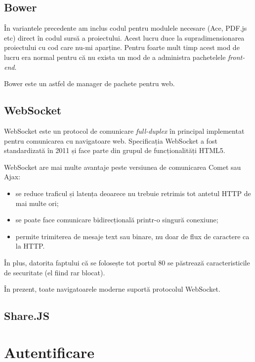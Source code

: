 \documentclass[a4wide,12pt]{report}
\newcommand{\eng}[1]{\emph{#1}} %
\begin{document}
\subsection{Bower}
\label{bowersub}

În variantele precedente am inclus codul pentru modulele necesare (Ace, PDF.js
etc) direct în codul sursă a proiectului. Acest lucru duce la supradimensionarea
proiectului cu cod care nu-mi aparține. Pentru foarte mult timp acest mod de
lucru era normal pentru că nu exista un mod de a administra pachetelele
\eng{front-end}.

Bower este un astfel de manager de pachete pentru web.

\subsection{WebSocket}
\label{websocketsub}

WebSocket este un protocol de comunicare \eng{full-duplex} în principal
implementat pentru comunicarea cu navigatoare web. Specificația WebSocket a fost
standardizată în 2011 și face parte din grupul de funcționalități HTML5.

WebSocket are mai multe avantaje peste versiunea de comunicarea Comet sau Ajax:

\begin{itemize}

\item se reduce traficul și latența deoarece nu trebuie retrimis tot antetul
HTTP de mai multe ori;

\item se poate face comunicare bidirecțională printr-o singură conexiune;

\item permite trimiterea de mesaje text sau binare, nu doar de flux de caractere
ca la HTTP.

\end{itemize}

În plus, datorita faptului că se folosește tot portul 80 se păstrează
caracteristicile de securitate (el fiind rar blocat).

În prezent, toate navigatoarele moderne suportă protocolul WebSocket.

\subsection{Share.JS}
\label{sharejssub}

\section{Autentificare}
\end{document}
